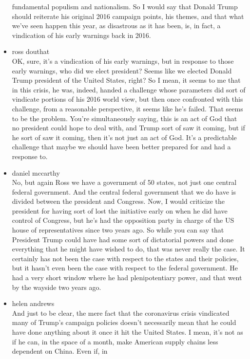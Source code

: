 \begin{itemize}
  fundamental populism and nationalism. So I would say that Donald Trump
  should reiterate his original 2016 campaign points, his themes, and
  that what we've seen happen this year, as disastrous as it has been,
  is, in fact, a vindication of his early warnings back in 2016.
\item
  ross douthat\\
  OK, sure, it's a vindication of his early warnings, but in response to
  those early warnings, who did we elect president? Seems like we
  elected Donald Trump president of the United States, right? So I mean,
  it seems to me that in this crisis, he was, indeed, handed a challenge
  whose parameters did sort of vindicate portions of his 2016 world
  view, but then once confronted with this challenge, from a reasonable
  perspective, it seems like he's failed. That seems to be the problem.
  You're simultaneously saying, this is an act of God that no president
  could hope to deal with, and Trump sort of saw it coming, but if he
  sort of saw it coming, then it's not just an act of God. It's a
  predictable challenge that maybe we should have been better prepared
  for and had a response to.
\item
  daniel mccarthy\\
  No, but again Ross we have a government of 50 states, not just one
  central federal government. And the central federal government that we
  do have is divided between the president and Congress. Now, I would
  criticize the president for having sort of lost the initiative early
  on when he did have control of Congress, but he's had the opposition
  party in charge of the US house of representatives since two years
  ago. So while you can say that President Trump could have had some
  sort of dictatorial powers and done everything that he might have
  wished to do, that was never really the case. It certainly has not
  been the case with respect to the states and their policies, but it
  hasn't even been the case with respect to the federal government. He
  had a very short window where he had plenipotentiary power, and that
  went by the wayside two years ago.
\item
  helen andrews\\
  And just to be clear, the mere fact that the coronavirus crisis
  vindicated many of Trump's campaign policies doesn't necessarily mean
  that he could have done anything about it once it hit the United
  States. I mean, it's not as if he can, in the space of a month, make
  American supply chains less dependent on China. Even if, in

\end{itemize}
